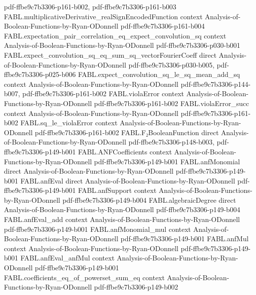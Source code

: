 \begin{theorem}
  {pdf-ffbe9c7b3306-p161-b002,
    pdf-ffbe9c7b3306-p161-b003}
\proofstep
  {FABL.multiplicativeDerivative_realSignEncodedFunction}
  {context}
  {Analysis-of-Boolean-Functions-by-Ryan-ODonnell}
  {pdf-ffbe9c7b3306-p161-b004}
\proofstep
  {FABL.expectation_pair_correlation_eq_expect_convolution_sq}
  {context}
  {Analysis-of-Boolean-Functions-by-Ryan-ODonnell}
  {pdf-ffbe9c7b3306-p030-b001}
\proofstep
  {FABL.expect_convolution_sq_eq_sum_sq_vectorFourierCoeff}
  {direct}
  {Analysis-of-Boolean-Functions-by-Ryan-ODonnell}
  {pdf-ffbe9c7b3306-p030-b005,
    pdf-ffbe9c7b3306-p025-b006}
\proofstep
  {FABL.expect_convolution_sq_le_sq_mean_add_sq}
  {context}
  {Analysis-of-Boolean-Functions-by-Ryan-ODonnell}
  {pdf-ffbe9c7b3306-p144-b007,
    pdf-ffbe9c7b3306-p161-b002}
\proofstep
  {FABL.violaError}
  {context}
  {Analysis-of-Boolean-Functions-by-Ryan-ODonnell}
  {pdf-ffbe9c7b3306-p161-b002}
\proofstep
  {FABL.violaError_succ}
  {context}
  {Analysis-of-Boolean-Functions-by-Ryan-ODonnell}
  {pdf-ffbe9c7b3306-p161-b002}
\proofstep
  {FABL.sq_le_violaError}
  {context}
  {Analysis-of-Boolean-Functions-by-Ryan-ODonnell}
  {pdf-ffbe9c7b3306-p161-b002}
\proofstep
  {FABL.F₂BooleanFunction}
  {direct}
  {Analysis-of-Boolean-Functions-by-Ryan-ODonnell}
  {pdf-ffbe9c7b3306-p148-b003,
    pdf-ffbe9c7b3306-p149-b001}
\proofstep
  {FABL.ANFCoefficients}
  {context}
  {Analysis-of-Boolean-Functions-by-Ryan-ODonnell}
  {pdf-ffbe9c7b3306-p149-b001}
\proofstep
  {FABL.anfMonomial}
  {direct}
  {Analysis-of-Boolean-Functions-by-Ryan-ODonnell}
  {pdf-ffbe9c7b3306-p149-b001}
\proofstep
  {FABL.anfEval}
  {direct}
  {Analysis-of-Boolean-Functions-by-Ryan-ODonnell}
  {pdf-ffbe9c7b3306-p149-b001}
\proofstep
  {FABL.anfSupport}
  {context}
  {Analysis-of-Boolean-Functions-by-Ryan-ODonnell}
  {pdf-ffbe9c7b3306-p149-b004}
\proofstep
  {FABL.algebraicDegree}
  {direct}
  {Analysis-of-Boolean-Functions-by-Ryan-ODonnell}
  {pdf-ffbe9c7b3306-p149-b004}
\proofstep
  {FABL.anfEval_add}
  {context}
  {Analysis-of-Boolean-Functions-by-Ryan-ODonnell}
  {pdf-ffbe9c7b3306-p149-b001}
\proofstep
  {FABL.anfMonomial_mul}
  {context}
  {Analysis-of-Boolean-Functions-by-Ryan-ODonnell}
  {pdf-ffbe9c7b3306-p149-b001}
\proofstep
  {FABL.anfMul}
  {context}
  {Analysis-of-Boolean-Functions-by-Ryan-ODonnell}
  {pdf-ffbe9c7b3306-p149-b001}
\proofstep
  {FABL.anfEval_anfMul}
  {context}
  {Analysis-of-Boolean-Functions-by-Ryan-ODonnell}
  {pdf-ffbe9c7b3306-p149-b001}
\proofstep
  {FABL.coefficients_eq_of_powerset_sum_eq}
  {context}
  {Analysis-of-Boolean-Functions-by-Ryan-ODonnell}
  {pdf-ffbe9c7b3306-p149-b002}

\end{theorem}
